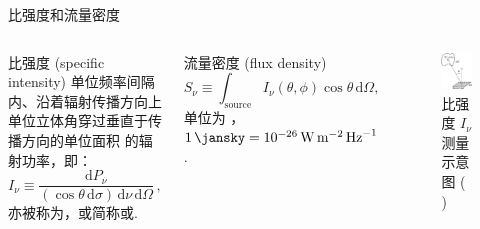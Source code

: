 \documentclass{beamer}
\newcommand{\R}[1]{\text{#1}}  %
\newcommand{\D}[1]{\R{d}#1}
\newcommand{\citeay}[1]{\citeauthor{#1} \citeyear{#1} \parencite{#1}}
\let\emph\relax  %
\begin{document}
\begin{frame}{比强度和流量密度}
  \begin{columns}
      \begin{alertblock}{比强度 (specific intensity)}
        \smallskip
        单位频率间隔内、沿着辐射传播方向上单位立体角穿过垂直于传播方向的单位面积
        的辐射功率，即：
        \begin{equation}
          I_{\nu} \equiv
            \frac{\D{P_{\nu}}}{(\cos\theta\,\D{\sigma})
              \,\D{\nu} \,\D{\Omega}} \,,
        \end{equation}
        亦被称为\emph{谱亮度}，或简称\emph{强度}或\emph{亮度}.
      \end{alertblock}

      \begin{alertblock}{流量密度 (flux density)}
        \smallskip
        \begin{equation}
          S_{\nu} \equiv
            \int_{\R{source}} I_{\nu}(\theta,\phi) \cos\theta \,\D{\Omega} ,
        \end{equation}
        单位为 \si{\jansky}，
        $\SI{1}{\jansky} = \SI{e-26}{\watt\per\square\meter\per\hertz}$.
      \end{alertblock}

      \begin{figure}
        \centering
        \includegraphics[width=0.9\columnwidth]{specific-intensity}
        \caption{比强度 $I_{\nu}$ 测量示意图 (\citeay{condon2016})}
      \end{figure}
  \end{columns}
\end{frame}
\end{document}
